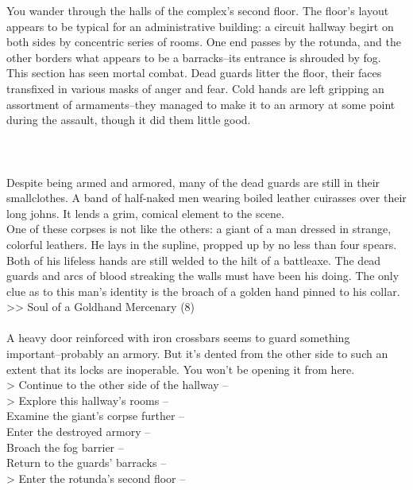 You wander through the halls of the complex’s second floor. The floor's layout appears to be typical for an administrative building: a circuit hallway begirt on both sides by concentric series of rooms. One end passes by the rotunda, and the other borders what appears to be a barracks--its entrance is shrouded by fog.\\

This section has seen mortal combat. Dead guards litter the floor, their faces transfixed in various masks of anger and fear. Cold hands are left gripping an assortment of armaments--they managed to make it to an armory at some point during the assault, though it did them little good.\\
\\
\\
\\

Despite being armed and armored, many of the dead guards are still in their smallclothes. A band of half-naked men wearing boiled leather cuirasses over their long johns. It lends a grim, comical element to the scene.\\

One of these corpses is not like the others: a giant of a man dressed in strange, colorful leathers. He lays in the supline, propped up by no less than four spears. Both of his lifeless hands are still welded to the hilt of a battleaxe. The dead guards and arcs of blood streaking the walls must have been his doing. The only clue as to this man's identity is the broach of a golden hand pinned to his collar.\\
>> Soul of a Goldhand Mercenary (8)\\
\\

A heavy door reinforced with iron crossbars seems to guard something important--probably an armory. But it's dented from the other side to such an extent that its locks are inoperable. You won't be opening it from here.\\

> Continue to the other side of the hallway -- \\
> Explore this hallway's rooms -- \\
 Examine the giant's corpse further -- \\
 Enter the destroyed armory -- \\
 Broach the fog barrier -- \\
 Return to the guards' barracks -- \\
> Enter the rotunda’s second floor -- 